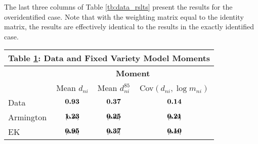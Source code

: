 \documentclass[12pt,dvips, ps2pdf]{article}
\renewcommand{\arraystretch}{1.1}
\begin{document}
The last three columns of Table \ref{tb:data_rslts} present the results for the overidentified case. Note that with the weighting matrix equal to the identity matrix, the results are effectively identical to the results in the exactly identified case.

\begin{table}[!h]
\footnotesize
{}
\renewcommand{\arraystretch}{1.65}
\setlength {\tabcolsep}{6mm}
\begin{center}\label{tb:data_model}
\begin{tabular}[t]{l  c c c}
\multicolumn{4}{c}{\normalsize\textbf{Table \ref{tb:data_model}: Data and Fixed Variety Model Moments}}
\\
\hline
\hline
& \multicolumn{3}{c}{\textbf{Moment}}\\
 &  Mean $d_{ni}$ & Mean $d^{85}_{ni}$  &  Cov$(d_{ni}, \log m_{ni})$ \\
\hline
Data &  $\begin{array}{c}{\textbf{0.93}} \vspace{-.4cm}\\ \scriptstyle{}\end{array}$   & $\begin{array}{c}{\textbf{0.37}} \vspace{-.4cm}\\ \scriptstyle{}\end{array}$  & $\begin{array}{c}{\textbf{0.14}} \vspace{-.4cm}\\ \scriptstyle{}\end{array}$ \\
Armington   & $\begin{array}{c}{\textbf{1.23}} \vspace{-.4cm}\\ \scriptstyle{[0.16]}\end{array}$   & $\begin{array}{c}{\textbf{0.25}} \vspace{-.4cm}\\ \scriptstyle{[0.02]}\end{array}$  & $\begin{array}{c}{\textbf{0.21}} \vspace{-.4cm}\\ \scriptstyle{[0.15]}\end{array}$ \\
EK              & $\begin{array}{c}{\textbf{0.95}} \vspace{-.4cm}\\ \scriptstyle{[0.09]}\end{array}$  & $\begin{array}{c}{\textbf{0.37}} \vspace{-.4cm}\\ \scriptstyle{[0.01]}\end{array}$  & $\begin{array}{c}{\textbf{0.10}} \vspace{-.4cm}\\ \scriptstyle{[0.09]}\end{array}$        \\

\end{tabular}
\end{center}
\end{table}
\end{document}
